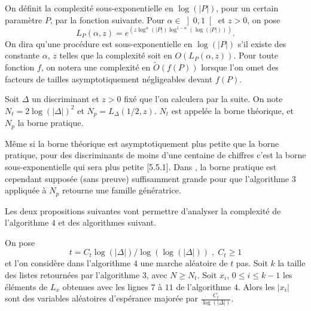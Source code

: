 \begin{Def}
	
	On définit la complexité sous-exponentielle en $\log(|P|)$, pour un certain paramètre $P$, par la fonction suivante. Pour $\alpha\in\left] 0,1 \right[$ et $z>0$, on pose
	\begin{equation*}
		L_P(\alpha,z) = e^{\left( z\log^{\alpha}(|P|)\log^{1-\alpha}(\log(|P|))\right) }.
	\end{equation*}
	On dira qu'une procédure est sous-exponentielle en $\log(|P|)$ s'il existe des constante $\alpha$, $z$ telles que la complexité soit en $O(L_P(\alpha,z))$. Pour toute fonction $f$, on notera une complexité en $\tilde{O}(f(P))$ lorsque l'on omet des facteurs de tailles asymptotiquement négligeables devant $f(P)$.
	
\end{Def}

\begin{Def}
	Soit $\Delta$ un discriminant et $z>0$ fixé que l'on calculera par la suite. On note $N_{t} = 2\log(|\Delta|)^{2}$ et $N_{p} = L_\Delta(1/2,z)$. $N_{t}$ est appelée la borne théorique, et $N_{p}$ la borne pratique. 
\end{Def}

\begin{Rem}
	Même si la borne théorique est asymptotiquement plus petite que la borne pratique, pour des discriminants de moins d'une centaine de chiffres c'est la borne sous-exponentielle qui sera plus petite \cite{Coh00}[5.5.1]. Dans \cite{JaoSoukharev}, la borne pratique est cependant supposée (sans preuve) suffisamment grande pour que l'algorithme $3$ appliquée à $N_{p}$ retourne une famille génératrice.
\end{Rem}

Les deux propositions suivantes vont permettre d'analyser la complexité de l'algorithme $4$ et des algorithmes suivant.

\begin{Prop}
	On pose
	\begin{equation*}
		t = C_{t}\log\left( |\Delta|\right) /\log\left( \log\left( |\Delta|\right) \right)\;,\; C_{t} \geq 1
	\end{equation*}
	et l'on considère dans l'algorithme $4$ une marche aléatoire de $t$ pas. Soit $k$ la taille des listes retournées par l'algorithme $3$, avec $N \geq N_{t}$. Soit $x_{i}$, $0\leq i \leq k-1$ les éléments de $L_{x}$ obtenues avec les lignes $7$ à $11$ de l'algorithme $4$. Alors les $|x_{i}|$ sont des variables aléatoires d'espérance majorée par $\frac{C_{t}}{\log(|\Delta|)}$. 
\end{Prop}

